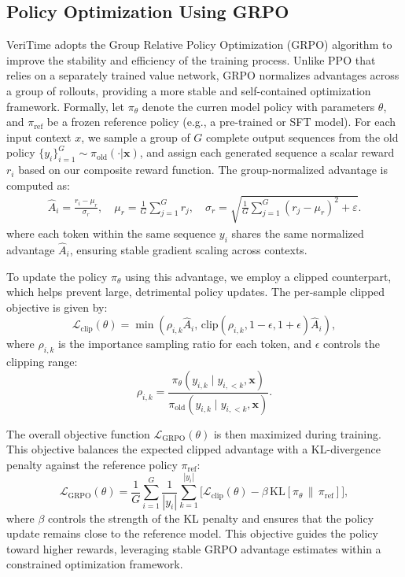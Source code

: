 \documentclass{article}
\theoremstyle{plain}
\theoremstyle{definition}
\theoremstyle{remark}
\begin{document}
\subsection{Policy Optimization Using GRPO} 
VeriTime adopts the Group Relative Policy Optimization (GRPO) \cite{shao2024deepseekmath} algorithm to improve the stability and efficiency of the training process. Unlike PPO \cite{schulman2017ppo} that relies on a separately trained value network, GRPO normalizes advantages across a group of rollouts, providing a more stable and self-contained optimization framework. Formally, let \(\pi_\theta\) denote the curren model policy with parameters \(\theta\), and \(\pi_{\text{ref}}\) be a frozen reference policy (e.g., a pre-trained or SFT model). For each input context \(x\), we sample a group of \(G\) complete output sequences from the old policy \(\{y_i\}_{i=1}^{G} \sim \pi_{\text{old}}(\cdot|\mathbf{x})\), and assign each generated sequence a scalar reward \(r_i\) based on our composite reward function. The group-normalized advantage is computed as:
\begin{align}
    \hat{A}_i = \frac{r_i - \mu_r}{\sigma_r}, \quad 
    \mu_r = \frac{1}{G} \sum_{j=1}^{G} r_j, \quad 
    \sigma_r = \sqrt{\frac{1}{G} \sum_{j=1}^{G} (r_j - \mu_r)^2 + \varepsilon}.
\end{align}
where each token within the same sequence \(y_i\) shares the same normalized advantage \(\hat{A}_i\), ensuring stable gradient scaling across contexts.

To update the policy \(\pi_\theta\) using this advantage, we employ a clipped counterpart, which helps prevent large, detrimental policy updates. The per-sample clipped objective is given by:
\begin{equation}
    \mathcal{L}_{\text{clip}}(\theta) = \min\left( \rho_{i,k} \hat{A}_i, \, \text{clip}(\rho_{i,k}, 1 - \epsilon, 1 + \epsilon) \hat{A}_i \right),
\end{equation}
where \(\rho_{i,k}\) is the importance sampling ratio for each token, and \(\epsilon\) controls the clipping range:
\begin{equation}
    \rho_{i,k} = 
    \frac{
    \pi_\theta(y_{i,k}\mid y_{i,<k}, \mathbf{x})
    }{
    \pi_{\text{old}}(y_{i,k}\mid y_{i,<k}, \mathbf{x})
    }.
\end{equation}


The overall objective function \(\mathcal{L}_{\text{GRPO}}(\theta)\) is then maximized during training. This objective balances the expected clipped advantage with a KL-divergence penalty against the reference policy \(\pi_{\text{ref}}\):
\begin{equation}
    \mathcal{L}_{\text{GRPO}}(\theta) = 
    \frac{1}{G} \sum_{i=1}^{G} \frac{1}{|y_i|} \sum_{k=1}^{|y_i|}
    \Big[ \mathcal{L}_{\text{clip}}(\theta) - \beta\, \text{KL}\left[\pi_\theta \, \| \, \pi_{\text{ref}}\right] \Big],
\end{equation}
where \(\beta\) controls the strength of the KL penalty and ensures that the policy update remains close to the reference model. This objective guides the policy toward higher rewards, leveraging stable GRPO advantage estimates within a constrained optimization framework.
\end{document}
